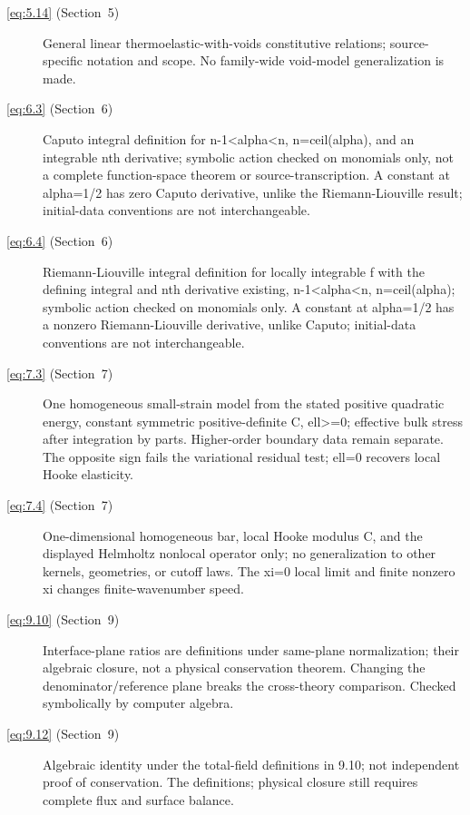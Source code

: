 \begin{description}
  \item[\eqref{eq:5.14} (Section~5)] General linear thermoelastic-with-voids constitutive relations; source-specific notation and scope. No family-wide void-model generalization is made.

  \item[\eqref{eq:6.3} (Section~6)] Caputo integral definition for n-1<alpha<n, n=ceil(alpha), and an integrable nth derivative; symbolic action checked on monomials only, not a complete function-space theorem or source-transcription. A constant at alpha=1/2 has zero Caputo derivative, unlike the Riemann-Liouville result; initial-data conventions are not interchangeable.

  \item[\eqref{eq:6.4} (Section~6)] Riemann-Liouville integral definition for locally integrable f with the defining integral and nth derivative existing, n-1<alpha<n, n=ceil(alpha); symbolic action checked on monomials only. A constant at alpha=1/2 has a nonzero Riemann-Liouville derivative, unlike Caputo; initial-data conventions are not interchangeable.

  \item[\eqref{eq:7.3} (Section~7)] One homogeneous small-strain model from the stated positive quadratic energy, constant symmetric positive-definite C, ell>=0; effective bulk stress after integration by parts. Higher-order boundary data remain separate. The opposite sign fails the variational residual test; ell=0 recovers local Hooke elasticity.

  \item[\eqref{eq:7.4} (Section~7)] One-dimensional homogeneous bar, local Hooke modulus C, and the displayed Helmholtz nonlocal operator only; no generalization to other kernels, geometries, or cutoff laws. The xi=0 local limit and finite nonzero xi changes finite-wavenumber speed.

  \item[\eqref{eq:9.10} (Section~9)] Interface-plane ratios are definitions under same-plane normalization; their algebraic closure, not a physical conservation theorem. Changing the denominator/reference plane breaks the cross-theory comparison. Checked symbolically by computer algebra.

  \item[\eqref{eq:9.12} (Section~9)] Algebraic identity under the total-field definitions in 9.10; not independent proof of conservation. The definitions; physical closure still requires complete flux and surface balance.


\end{description}
